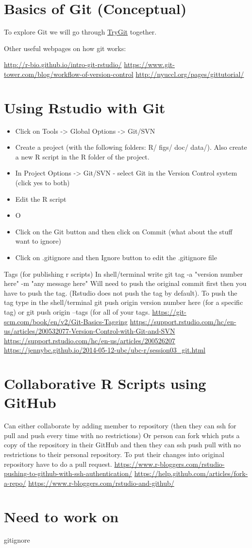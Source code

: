 \documentclass[12pt,letterpaper]{article} %
\begin{document}
\section*{Basics of Git (Conceptual)}
To explore Git we will go through \href{https://try.github.io/levels/1/challenges/1}{TryGit} together.

Other useful webpages on how git works:

\url{http://r-bio.github.io/intro-git-rstudio/}
\url{https://www.git-tower.com/blog/workflow-of-version-control}
\url{http://nyuccl.org/pages/gittutorial/}


\section*{Using Rstudio with Git}
\begin{itemize}
\item Click on Tools -> Global Options -> Git/SVN
\item Create a project (with the following folders: R/ figs/ doc/ data/). Also create a new R script in the R folder of the project.
\item In Project Options -> Git/SVN - select Git in the Version Control system (click yes to both)
\item Edit the R script
\item O
\item Click on the Git button and then click on Commit (what about the stuff want to ignore)
\item Click on .gitignore and then Ignore button to edit the .gitignore file
\end{itemize}

Tags (for publishing r scripts)
In shell/terminal write git tag -a "version number here" -m "any message here"
Will need to push the original commit first then you have to push the tag. (Rstudio does not push the tag by default). To push the tag type in the shell/terminal git push origin version number here (for a specific tag) or git push origin --tags (for all of your tags.
\url{https://git-scm.com/book/en/v2/Git-Basics-Tagging}
\url{https://support.rstudio.com/hc/en-us/articles/200532077-Version-Control-with-Git-and-SVN}
\url{https://support.rstudio.com/hc/en-us/articles/200526207}
\url{https://jennybc.github.io/2014-05-12-ubc/ubc-r/session03_git.html}


\section*{Collaborative R Scripts using GitHub}
Can either collaborate by adding member to repository (then they can ssh for pull and push every time with no restrictions)
Or person can fork which puts a copy of the repository in their GitHub and then they can ssh push pull with no restrictions to their personal repository. To put their changes into original repository have to do a pull request.
\url{https://www.r-bloggers.com/rstudio-pushing-to-github-with-ssh-authentication/}
\url{https://help.github.com/articles/fork-a-repo/}
\url{https://www.r-bloggers.com/rstudio-and-github/}
\section*{Need to work on}
gitignore
\end{document}
